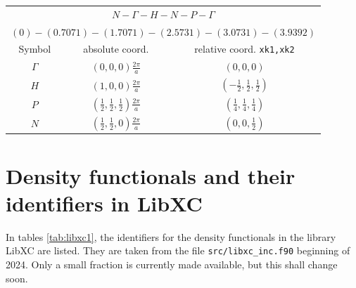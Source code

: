 \documentclass[final,12pt]{article}
\begin{document}
{{{{{{\begin{center}
\renewcommand\arraystretch{1.5}
\begin{tabular}{|c|c|c|}
\hline
\multicolumn{3}{|c|}{$N-\Gamma-H-N-P-\Gamma$}\\
\multicolumn{3}{|c|}{$(0)-(0.7071)-(1.7071)-(2.5731)-(3.0731)-(3.9392)$}\\
\hline
Symbol & absolute coord. & relative coord. \texttt{xk1,xk2}\\
\hline
$\Gamma$   & $(0,0,0) \frac{2\pi}{a}$ & $(0,0,0)$ \\ 
$H$        & $(1,0,0) \frac{2\pi}{a}$ & $(-\frac{1}{2},\frac{1}{2},\frac{1}{2})$ \\ 
$P$        & $(\frac{1}{2},\frac{1}{2},\frac{1}{2}) \frac{2\pi}{a}$ & $(\frac{1}{4},\frac{1}{4},\frac{1}{4})$ \\ 
$N$        & $(\frac{1}{2},\frac{1}{2},0) \frac{2\pi}{a}$ & $(0,0,\frac{1}{2})$ \\ 
\hline
\end{tabular}
\renewcommand\arraystretch{1.}
\end{center}
\clearpage


\newpage
\section{Density functionals and their identifiers in LibXC}
\label{sec:libxcids}
In tables \ref{tab:libxc1}, the identifiers for the density
functionals in the library LibXC are listed. They are taken from the
file \verb|src/libxc_inc.f90| beginning of 2024. Only a small fraction
is currently made available, but this shall change soon.


}}}}}}
\end{document}
